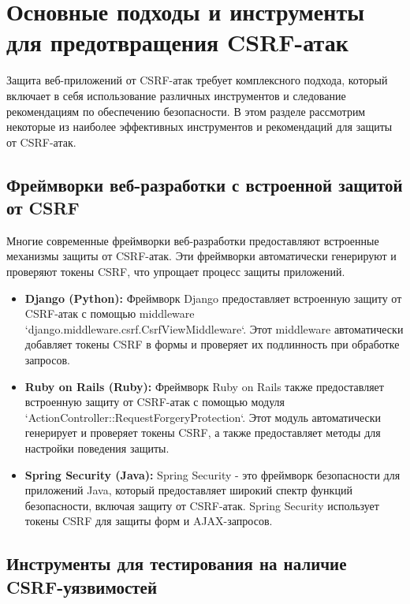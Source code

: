 \documentclass[a4paper,12pt]{diplom}
\begin{document}
	 
	 
	 
	 
	 
	 
	 
	 
	 
	 
	 
	 
	 \section{Основные подходы и инструменты для предотвращения CSRF-атак}
	 
	 Защита веб-приложений от CSRF-атак требует комплексного подхода, который включает в себя использование различных инструментов и следование рекомендациям по обеспечению безопасности. В этом разделе рассмотрим некоторые из наиболее эффективных инструментов и рекомендаций для защиты от CSRF-атак.
	 
	 \subsection{Фреймворки веб-разработки с встроенной защитой от CSRF}
	 
	 Многие современные фреймворки веб-разработки предоставляют встроенные механизмы защиты от CSRF-атак. Эти фреймворки автоматически генерируют и проверяют токены CSRF, что упрощает процесс защиты приложений.
	 
	 \begin{itemize}
	 	\item \textbf{Django (Python):} Фреймворк Django предоставляет встроенную защиту от CSRF-атак с помощью middleware `django.middleware.csrf.CsrfViewMiddleware`. Этот middleware автоматически добавляет токены CSRF в формы и проверяет их подлинность при обработке запросов.
	 	\item \textbf{Ruby on Rails (Ruby):} Фреймворк Ruby on Rails также предоставляет встроенную защиту от CSRF-атак с помощью модуля \\`ActionController::RequestForgeryProtection`. Этот модуль автоматически генерирует и проверяет токены CSRF, а также предоставляет методы для настройки поведения защиты.
	 	\item \textbf{Spring Security (Java):} Spring Security - это фреймворк безопасности для приложений Java, который предоставляет широкий спектр функций безопасности, включая защиту от CSRF-атак. Spring Security использует токены CSRF для защиты форм и AJAX-запросов. 
	 \end{itemize}
	 
	 \subsection{Инструменты для тестирования на наличие CSRF-уязвимостей}
	 
\end{document}
